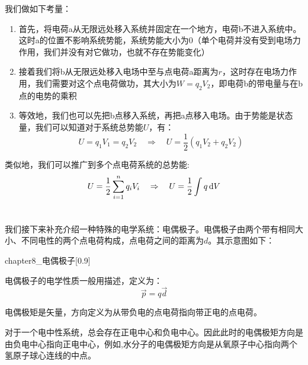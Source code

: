 我们做如下考量：
\begin{enumerate}
    \item 首先，将电荷a从无限远处移入系统并固定在一个地方，电荷b不进入系统中。这时a的位置不影响系统势能，系统势能大小为0（单个电荷并没有受到电场力作用，我们并没有对它做功，也就不存在势能变化）
    \item 接着我们将b从无限远处移入电场中至与点电荷a距离为$r$，这时存在电场力作用，我们需要对这个点电荷做功，其大小为$W=q_2 V_2$，即电荷b的带电量与在b点的电势的乘积
    \item 等效地，我们也可以先把b点移入系统，再把a点移入电场。由于势能是状态量，我们可以知道对于系统总势能$U$，有：
    \[U=q_1 V_1=q_2 V_2\quad\Rightarrow\quad U=\dfrac{1}{2}(q_1 V_2+q_2 V_2)\]
\end{enumerate}
\begin{law}[多点电荷系统总势能]
    类似地，我们可以推广到多个点电荷系统的总势能:
    \[U=\dfrac{1}{2}\sum_{i=1}^n q_i V_i\quad\Rightarrow\quad U=\dfrac{1}{2}\int q\dif{V}\]
\end{law}
\section[电偶极子]{}
\subsection[电偶极子及其性质]{}
我们接下来补充介绍一种特殊的电学系统：电偶极子。电偶极子由两个带有相同大小、不同电性的两个点电荷构成，点电荷之间的距离为$d$。其示意图如下：\par
\begin{minipage}{0.2\textwidth}
    \begin{singlefigure}[电偶极子示意图]{chapter8_电偶极子}[0.9]
    \end{singlefigure}
\end{minipage}
\begin{minipage}{0.75\textwidth}
    电偶极子的电学性质一般用描述，定义为：
    \[\vec{p}=q\vec{d}\]

    电偶极矩是矢量，方向定义为从带负电的点电荷指向带正电的点电荷。
\end{minipage}

对于一个电中性系统，总会存在正电中心和负电中心。因此此时的电偶极矩方向是由负电中心指向正电中心，例如,水分子的电偶极矩方向是从氧原子中心指向两个氢原子球心连线的中点。

